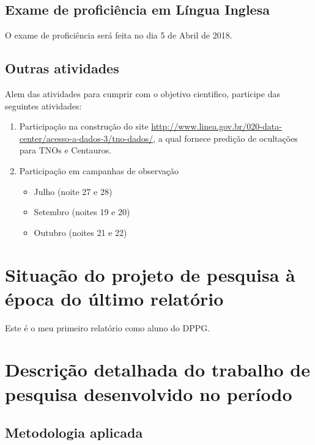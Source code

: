 \documentclass[a4paper, 11pt]{article}
\begin{document}
\subsection{Exame de profici\^encia em L\'ingua Inglesa}

O exame de proficiência será feita no dia 5 de Abril de 2018.

\subsection{Outras atividades}

Alem das atividades para cumprir com o objetivo cientifico, participe das seguintes atividades:

\begin{enumerate}
  \item Participação na construção do site \url{http://www.linea.gov.br/020-data-center/acesso-a-dados-3/tno-dados/}, a qual fornece predição de ocultações para TNOs e Centauros. 
  \item Participação em campanhas de observação 
  \begin{itemize}
    \item Julho (noite 27 e 28)
    \item Setembro (noites 19 e 20)
    \item Outubro (noites 21 e 22)
  \end{itemize}
\end{enumerate}
\section{Situação do projeto de pesquisa à época do último relatório}
Este é o meu primeiro relatório como aluno do DPPG.
\section{Descrição detalhada do trabalho de pesquisa desenvolvido no período}

\subsection{Metodologia aplicada}
\end{document}
